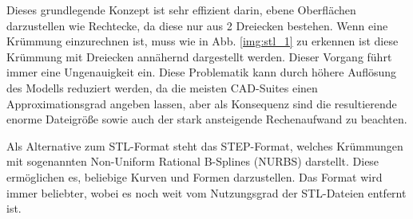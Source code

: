 \documentclass[../main.tex]{subfiles}
\begin{document}
Dieses grundlegende Konzept ist sehr effizient darin, ebene Oberflächen darzustellen wie Rechtecke, da diese nur aus 2 Dreiecken bestehen. Wenn eine Krümmung einzurechnen ist, muss wie in Abb. \ref{img:stl_1} zu erkennen ist diese Krümmung mit Dreiecken annähernd dargestellt werden. Dieser Vorgang führt immer eine Ungenauigkeit ein. Diese Problematik kann durch höhere Auflösung des Modells reduziert werden, da die meisten CAD-Suites einen Approximationsgrad angeben lassen, aber als Konsequenz sind die resultierende enorme Dateigröße sowie auch der stark ansteigende Rechenaufwand zu beachten. \parencite{ADOBLESTL} 

Als Alternative zum STL-Format steht das STEP-Format, welches Krümmungen mit sogenannten Non-Uniform Rational B-Splines (NURBS) darstellt.
Diese ermöglichen es, beliebige Kurven und Formen darzustellen. Das Format wird immer beliebter, wobei es noch weit  vom Nutzungsgrad der STL-Dateien entfernt ist. \parencite{ADOBESTEP}
\end{document}
